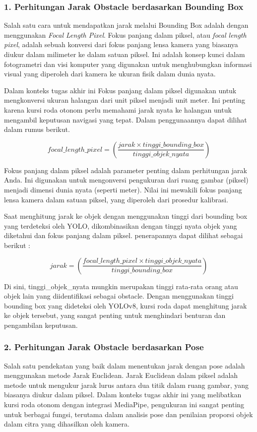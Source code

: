 \subsubsection*{1. Perhitungan Jarak Obstacle berdasarkan Bounding Box}
Salah satu cara untuk mendapatkan jarak melalui Bounding Box adalah dengan menggunakan \emph{Focal Length Pixel}. Fokus panjang dalam piksel, atau \emph{focal length pixel}, adalah sebuah konversi dari fokus panjang lensa kamera yang biasanya diukur dalam milimeter ke dalam satuan piksel. Ini adalah konsep kunci dalam fotogrametri dan visi komputer yang digunakan untuk menghubungkan informasi visual yang diperoleh dari kamera ke ukuran fisik dalam dunia nyata.

Dalam konteks tugas akhir ini Fokus panjang dalam piksel digunakan untuk mengkonversi ukuran halangan dari unit piksel menjadi unit meter. Ini penting karena kursi roda otonom perlu memahami jarak nyata ke halangan untuk mengambil keputusan navigasi yang tepat. Dalam penggunaannya dapat dilihat dalam rumus berikut.

\begin{equation}
    focal\_length\_pixel = \left (\frac{jarak\times tinggi\_bounding\_box }{tinggi\_objek\_nyata}\right )
\end{equation}

Fokus panjang dalam piksel adalah parameter penting dalam perhitungan jarak Anda. Ini digunakan untuk mengonversi pengukuran dari ruang gambar (piksel) menjadi dimensi dunia nyata (seperti meter). Nilai ini mewakili fokus panjang lensa kamera dalam satuan piksel, yang diperoleh dari prosedur kalibrasi. 

Saat menghitung jarak ke objek dengan menggunakan tinggi dari bounding box yang terdeteksi oleh YOLO, dikombinasikan dengan tinggi nyata objek yang diketahui dan fokus panjang dalam piksel. penerapannya dapat dilihat sebagai berikut :

\begin{equation}
    jarak = \left ( \frac{focal\_length\_pixel \times tinggi\_objek\_nyata}{tinggi\_bounding\_box} \right )
\end{equation}

Di sini, tinggi\_objek\_nyata mungkin merupakan tinggi rata-rata orang atau objek lain yang diidentifikasi sebagai obstacle. Dengan menggunakan tinggi bounding box yang dideteksi oleh YOLOv8, kursi roda dapat menghitung jarak ke objek tersebut, yang sangat penting untuk menghindari benturan dan pengambilan keputusan.

\subsubsection*{2. Perhitungan Jarak Obstacle berdasarkan Pose}
Salah satu pendekatan yang baik dalam menentukan jarak dengan pose adalah menggunakan metode Jarak Euclidean. Jarak Euclidean dalam piksel adalah metode untuk mengukur jarak lurus antara dua titik dalam ruang gambar, yang biasanya diukur dalam piksel. Dalam konteks tugas akhir ini yang melibatkan kursi roda otonom dengan integrasi MediaPipe, pengukuran ini sangat penting untuk berbagai fungsi, terutama dalam analisis pose dan penilaian proporsi objek dalam citra yang dihasilkan oleh kamera. 

